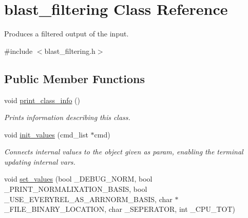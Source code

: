 \hypertarget{classblast__filtering}{
\section{blast\_\-filtering Class Reference}
\label{classblast__filtering}
}


Produces a filtered output of the input.  




{\ttfamily \#include $<$blast\_\-filtering.h$>$}

\subsection*{Public Member Functions}
\begin{DoxyCompactItemize}
\item 
\hypertarget{classblast__filtering_a3882035672d4a216c406f8dfe4d34ca7}{
void \hyperlink{classblast__filtering_a3882035672d4a216c406f8dfe4d34ca7}{print\_\-class\_\-info} ()}
\label{classblast__filtering_a3882035672d4a216c406f8dfe4d34ca7}

\begin{DoxyCompactList}\small\item\em Prints information describing this class. \end{DoxyCompactList}\item 
\hypertarget{classblast__filtering_a9915dc661c251e3fb0c1e482635efa0e}{
void \hyperlink{classblast__filtering_a9915dc661c251e3fb0c1e482635efa0e}{init\_\-values} (cmd\_\-list $\ast$cmd)}
\label{classblast__filtering_a9915dc661c251e3fb0c1e482635efa0e}

\begin{DoxyCompactList}\small\item\em Connects internal values to the object given as param, enabling the terminal updating internal vars. \end{DoxyCompactList}\item 
\hypertarget{classblast__filtering_af364a9a29e3adce91d5d5c844fceca60}{
void \hyperlink{classblast__filtering_af364a9a29e3adce91d5d5c844fceca60}{set\_\-values} (bool \_\-DEBUG\_\-NORM, bool \_\-PRINT\_\-NORMALIXATION\_\-BASIS, bool \_\-USE\_\-EVERYREL\_\-AS\_\-ARRNORM\_\-BASIS, char $\ast$\_\-FILE\_\-BINARY\_\-LOCATION, char \_\-SEPERATOR, int \_\-CPU\_\-TOT)}
\label{classblast__filtering_af364a9a29e3adce91d5d5c844fceca60}


\end{DoxyCompactItemize}
